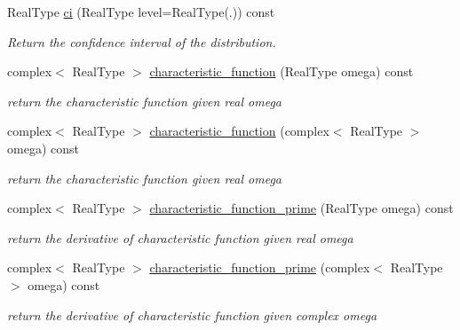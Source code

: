 \begin{DoxyCompactItemize}
\mbox{\label{structexponential__distribution_a82795203f013b479354e595a86a4e9c7}} 
Real\+Type \mbox{\hyperlink{structexponential__distribution_a82795203f013b479354e595a86a4e9c7}{ci}} (Real\+Type level=Real\+Type(.)) const
\begin{DoxyCompactList}\small\item\em Return the confidence interval of the distribution. \end{DoxyCompactList}\item 
\mbox{\label{structexponential__distribution_a2bf78de88b60b9a71773e7eed995f6af}} 
complex$<$ Real\+Type $>$ \mbox{\hyperlink{structexponential__distribution_a2bf78de88b60b9a71773e7eed995f6af}{characteristic\+\_\+function}} (Real\+Type omega) const
\begin{DoxyCompactList}\small\item\em return the characteristic function given real omega \end{DoxyCompactList}\item 
\mbox{\label{structexponential__distribution_a8dcb026c43f1bf11e0d9be13be7fad8b}} 
complex$<$ Real\+Type $>$ \mbox{\hyperlink{structexponential__distribution_a8dcb026c43f1bf11e0d9be13be7fad8b}{characteristic\+\_\+function}} (complex$<$ Real\+Type $>$ omega) const
\begin{DoxyCompactList}\small\item\em return the characteristic function given real omega \end{DoxyCompactList}\item 
\mbox{\label{structexponential__distribution_a4c21674b8fce155aa80f35f1853f6287}} 
complex$<$ Real\+Type $>$ \mbox{\hyperlink{structexponential__distribution_a4c21674b8fce155aa80f35f1853f6287}{characteristic\+\_\+function\+\_\+prime}} (Real\+Type omega) const
\begin{DoxyCompactList}\small\item\em return the derivative of characteristic function given real omega \end{DoxyCompactList}\item 
\mbox{\label{structexponential__distribution_a6288c257169dbf88f4050419b9a4f971}} 
complex$<$ Real\+Type $>$ \mbox{\hyperlink{structexponential__distribution_a6288c257169dbf88f4050419b9a4f971}{characteristic\+\_\+function\+\_\+prime}} (complex$<$ Real\+Type $>$ omega) const
\begin{DoxyCompactList}\small\item\em return the derivative of characteristic function given complex omega \end{DoxyCompactList}\end{DoxyCompactItemize}
